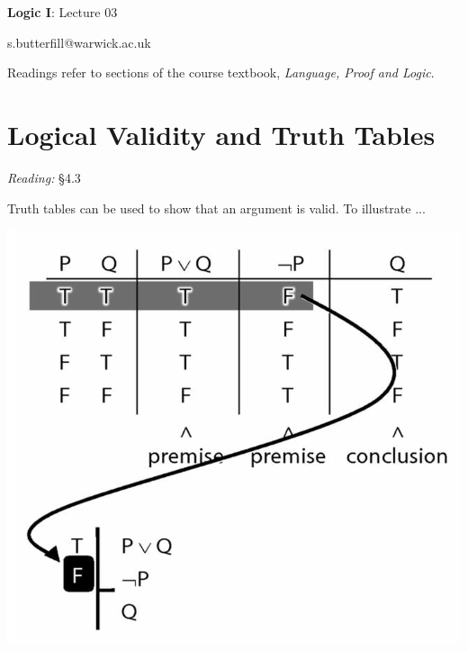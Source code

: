 \documentclass[12pt]{extarticle}
\date{}
\makeatletter
\def \ititle {Origins of Mind}
\def \isubtitle {Lecture 08}
\def \iemail{s.butterfill@warwick.ac.uk}
\makeatother
\begin{document}

\begin{multicols*}{3}

\setlength\footnotesep{1em}








\def \ititle {Logic I}
 
\def \isubtitle {Lecture 03}
 
\begin{center}
 
{\Large
 
\textbf{\ititle}: \isubtitle
 
}
 
 
 
\iemail %
 
\end{center}
 
Readings refer to sections of the course textbook, \emph{Language, Proof and Logic}.
 
 
 
\section{Logical Validity and Truth Tables}
 
\emph{Reading:} §4.3
 
\begin{minipage}{\columnwidth}
 
Truth tables can be used to show that an argument is valid. To illustrate ...
 
\begin{center}
\includegraphics[scale=0.3]{img/unit_14_example.png}
\end{center}
\end{minipage}
 

\end{multicols*}
\end{document}
